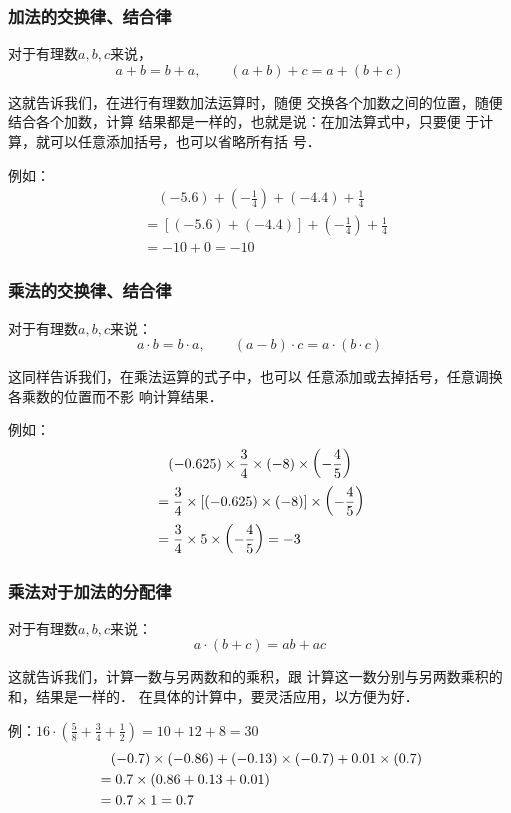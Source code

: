 \subsubsection{加法的交换律、结合律}
\begin{blk}{}
对于有理数$a,b,c$来说，
\[a+b=b+a,\qquad (a+b)+c=a+(b+c)\]
\end{blk}

这就告诉我们，在进行有理数加法运算时，随便
交换各个加数之间的位置，随便结合各个加数，计算
结果都是一样的，也就是说：在加法算式中，只要便
于计算，就可以任意添加括号，也可以省略所有括
号．

例如：
\[\begin{split}
&\quad (-5.6)+\left(-\frac{1}{4}\right)+(-4.4)+\frac{1}{4}\\
&=[(-5.6)+(-4.4)]+\left(-\frac{1}{4}\right)+\frac{1}{4}\\
&=-10+0=-10
\end{split}\]

\subsubsection{乘法的交换律、结合律}
\begin{blk}{}
    对于有理数$a, b, c$来说：
   \[ a\cdot b=b\cdot a,\qquad   (a-b)\cdot c=a\cdot  (b\cdot  c)\]
\end{blk}


   这同样告诉我们，在乘法运算的式子中，也可以
任意添加或去掉括号，任意调换各乘数的位置而不影
响计算结果．

例如：\[\begin{split}
   &\quad  (-0.625)\times\dfrac{3}{4}\times(-8)\times\left(-\dfrac{4}{5}\right)\\
    &=\dfrac{3}{4}\times[(-0.625)\times(-8)]\times\left(-\dfrac{4}{5}\right)\\
    &=\dfrac{3}{4}\times5\times\left(-\dfrac{4}{5}\right)=-3
\end{split}\]


\subsubsection{乘法对于加法的分配律}
\begin{blk}{}
对于有理数$a,  b,  c$来说：
\[ a\cdot (b+c)=ab+ac\]
\end{blk}

这就告诉我们，计算一数与另两数和的乘积，跟
计算这一数分别与另两数乘积的和，结果是一样的．
在具体的计算中，要灵活应用，以方便为好．

例：$16\cdot \left(\frac{5}{8}+\frac{3}{4}+\frac{1}{2}\right)=10+12+8=30$
\[\begin{split}
   &\quad (-0.7)\times (-0.86)+(-0.13)\times (-0.7)+0.01\times (0.7)\\
    &=0.7\times (0.86+0.13+0.01)\\
    &=0.7\times 1=0.7
\end{split}\]

